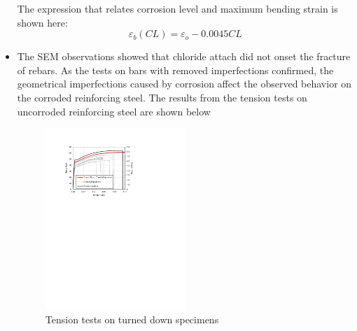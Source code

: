\begin{itemize}
    The expression that relates corrosion level and maximum bending strain is shown here:
    \begin{equation}
        \varepsilon_{b}(CL) = \varepsilon_{o}-0.0045CL
        \label{eq.Calderon_eb_vs_CL_ch7}
    \end{equation}
    
    \item The SEM observations showed that chloride attach did not onset the fracture of rebars. As the tests on bars with removed imperfections confirmed, the geometrical imperfections caused by corrosion affect the observed behavior on the corroded reinforcing steel. The results from the tension tests on uncorroded reinforcing steel are shown below
    
    \begin{figure}[htbp]
	\centering
	\includegraphics[width=0.5\textwidth]{VAC Thesis 2.0/Chapter-4/figs/TensionTest_TurnedDown.pdf}
	\caption{Tension tests on turned down specimens}
	\label{fig:TurnedDown_tension_tests_ch7}
\end{figure}


\end{itemize}
